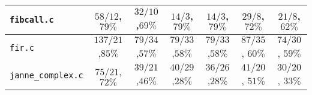 \begin{tabular}{ |l| |c|c|c|c| |c|c| }
  \\\hline
  \verb|fibcall.c|
  & \hspace{1em}$   58/12$,\hspace{.5em}$79\%$ & \hspace{.5em}$  32/10$,\hspace{.5em}$69\%$ & \hspace{1em}$    14/3$,\hspace{1em}$79\%$ & \hspace{1em}$    14/3$,\hspace{1em}$79\%$
& \hspace{1em}$29/8$,      \hspace{1em}$72\%$ & \hspace{1em}$21/8$,      \hspace{1em}$62\%$

  \\\hline
  \verb|fir.c|
  & \hspace{.5em}$  137/21$,\hspace{.5em}$85\%$ & \hspace{.5em}$  79/34$,\hspace{.5em}$57\%$ & \hspace{1em}$   79/33$,\hspace{.5em}$58\%$ & \hspace{1em}$   79/33$,\hspace{.5em}$58\%$
& \hspace{1em}$87/35$,     \hspace{.5em}$60\%$ & \hspace{1em}$74/30$,     \hspace{.5em}$59\%$

  \\\hline
  \verb|janne_complex.c|
  & \hspace{1em}$   75/21$,\hspace{.5em}$72\%$ & \hspace{.5em}$  39/21$,\hspace{.5em}$46\%$ & \hspace{1em}$   40/29$,\hspace{.5em}$28\%$ & \hspace{1em}$   36/26$,\hspace{.5em}$28\%$
& \hspace{1em}$41/20$,     \hspace{.5em}$51\%$ & \hspace{1em}$30/20$,     \hspace{.5em}$33\%$


\end{tabular}
